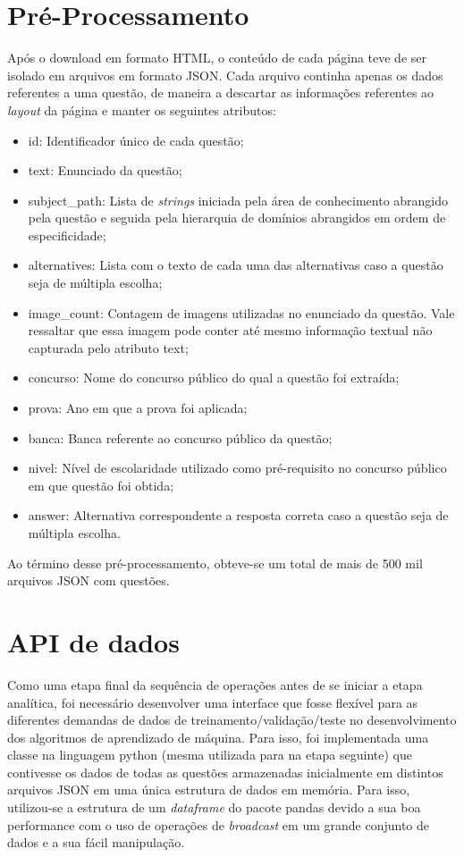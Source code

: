 \section{Pré-Processamento}

Após o download em formato HTML, o conteúdo de cada página teve de ser isolado em arquivos em formato JSON. Cada arquivo continha apenas os dados referentes a uma questão, de maneira a descartar as informações referentes ao \textit{layout} da página e manter os seguintes atributos:

\begin{itemize}
\item id: Identificador único de cada questão;
\item text: Enunciado da questão;
\item subject\_path: Lista de \textit{strings} iniciada pela área de conhecimento abrangido pela questão e seguida pela hierarquia de domínios abrangidos em ordem de especificidade;
\item alternatives: Lista com o texto de cada uma das alternativas caso a questão seja de múltipla escolha;
\item image\_count: Contagem de imagens utilizadas no enunciado da questão. Vale ressaltar que essa imagem pode conter até mesmo informação textual não capturada pelo atributo text;
\item concurso: Nome do concurso público do qual a questão foi extraída;
\item prova: Ano em que a prova foi aplicada;
\item banca: Banca referente ao concurso público da questão;
\item nivel: Nível de escolaridade utilizado como pré-requisito no concurso público em que questão foi obtida;
\item answer: Alternativa correspondente a resposta correta caso a questão seja de múltipla escolha.
\end{itemize}

Ao término desse pré-processamento, obteve-se um total de mais de 500 mil arquivos JSON com questões.

\section{API de dados}
\label{dataset_api}

Como uma etapa final da sequência de operações antes de se iniciar a etapa analítica, foi necessário desenvolver uma interface que fosse flexível para as diferentes demandas de dados de treinamento/validação/teste no desenvolvimento dos algoritmos de aprendizado de máquina. Para isso, foi implementada uma classe na linguagem python (mesma utilizada para na etapa seguinte) que contivesse os dados de todas as questões armazenadas inicialmente em distintos arquivos JSON em uma única estrutura de dados em memória. Para isso, utilizou-se a estrutura de um \textit{dataframe} do pacote pandas devido a sua boa performance com o uso de operações de \textit{broadcast} em um grande conjunto de dados e a sua fácil manipulação.

